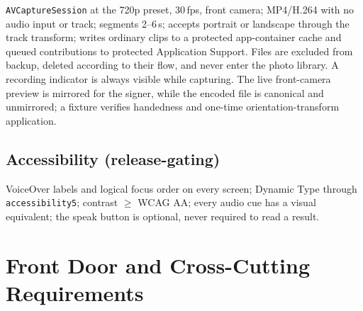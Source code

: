 \documentclass[11pt]{article}
\newcommand{\code}[1]{\texttt{#1}}
\begin{document}
\code{AVCaptureSession} at the 720p preset, 30\,fps, front camera; MP4/H.264 with no
audio input or track; segments 2--6\,s; accepts portrait or landscape through the
track transform; writes ordinary clips to a protected app-container cache and queued
contributions to protected Application Support. Files are excluded from backup,
deleted according to their flow, and never enter the photo library. A recording
indicator is always visible while capturing. The live front-camera preview is
mirrored for the signer, while the encoded file is canonical and unmirrored; a fixture
verifies handedness and one-time orientation-transform application.

\subsection{Accessibility (release-gating)}

VoiceOver labels and logical focus order on every screen; Dynamic Type through
\code{accessibility5}; contrast $\geq$ WCAG AA; every audio cue has a visual
equivalent; the speak button is optional, never required to read a result.

\section{Front Door and Cross-Cutting Requirements}
\label{sec:frontdoor}
\end{document}
